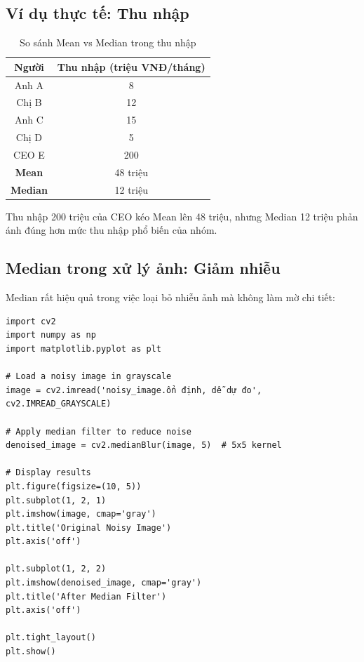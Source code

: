 \subsection{Ví dụ thực tế: Thu nhập}

\begin{table}[H]
\centering
\begin{tabular}{|c|c|}
\hline
\textbf{Người} & \textbf{Thu nhập (triệu VNĐ/tháng)} \\
\hline
Anh A & 8 \\
Chị B & 12 \\
Anh C & 15 \\
Chị D & 5 \\
CEO E & 200 \\
\hline
\textbf{Mean} & 48 triệu \\
\textbf{Median} & 12 triệu \\
\hline
\end{tabular}
\caption{So sánh Mean vs Median trong thu nhập}
\end{table}

Thu nhập 200 triệu của CEO kéo Mean lên 48 triệu, nhưng Median 12 triệu phản ánh đúng hơn mức thu nhập phổ biến của nhóm.

\subsection{Median trong xử lý ảnh: Giảm nhiễu}

Median rất hiệu quả trong việc loại bỏ nhiễu ảnh mà không làm mờ chi tiết:

\begin{lstlisting}[caption={Reducing image noise with Median},label={lst:median-denoising}]
import cv2
import numpy as np
import matplotlib.pyplot as plt

# Load a noisy image in grayscale
image = cv2.imread('noisy_image.ổn định, dễ dự đo', cv2.IMREAD_GRAYSCALE)

# Apply median filter to reduce noise
denoised_image = cv2.medianBlur(image, 5)  # 5x5 kernel

# Display results
plt.figure(figsize=(10, 5))
plt.subplot(1, 2, 1)
plt.imshow(image, cmap='gray')
plt.title('Original Noisy Image')
plt.axis('off')

plt.subplot(1, 2, 2)
plt.imshow(denoised_image, cmap='gray')
plt.title('After Median Filter')
plt.axis('off')

plt.tight_layout()
plt.show()
\end{lstlisting}

